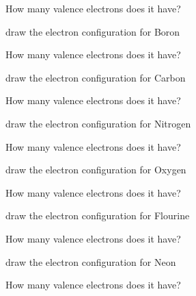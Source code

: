 \documentclass[12pt]{exam}
\begin{document}
\begin{questions}
How many valence electrons does it have? \fillin[1][1cm]


\question draw the electron configuration for Boron  

How many valence electrons does it have? \fillin[1][1cm]

\question draw the electron configuration for Carbon  

How many valence electrons does it have? \fillin[1][1cm]

\question draw the electron configuration for Nitrogen  

How many valence electrons does it have? \fillin[1][1cm]

\question draw the electron configuration for Oxygen  

How many valence electrons does it have? \fillin[1][1cm]

\question draw the electron configuration for Flourine  

How many valence electrons does it have? \fillin[1][1cm]

\question draw the electron configuration for Neon  

How many valence electrons does it have? \fillin[8][1cm]
\end{questions}
\end{document}
